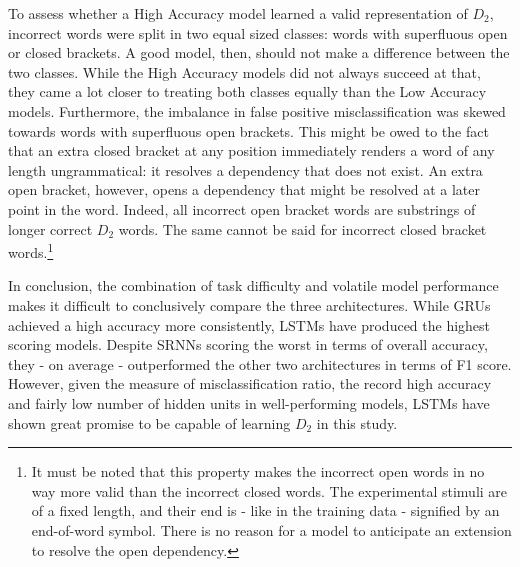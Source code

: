 To assess whether a High Accuracy model learned a valid representation of $D_{2}$, incorrect words were split in two equal sized classes: words with superfluous open or closed brackets. A good model, then, should not make a difference between the two classes. While the High Accuracy models did not always succeed at that, they came a lot closer to treating both classes equally than the Low Accuracy models. Furthermore, the imbalance in false positive misclassification was skewed towards words with superfluous open brackets. This might be owed to the fact that an extra closed bracket at any position immediately renders a word of any length ungrammatical: it resolves a dependency that does not exist. An extra open bracket, however, opens a dependency that might be resolved at a later point in the word. Indeed, all incorrect open bracket words are substrings of longer correct $D_{2}$ words. The same cannot be said for incorrect closed bracket words.\footnote{It must be noted that this property makes the incorrect open words in no way more valid than the incorrect closed words. The experimental stimuli are of a fixed length, and their end is - like in the training data - signified by an end-of-word symbol. There is no reason for a model to anticipate an extension to resolve the open dependency.}

In conclusion, the combination of task difficulty and volatile model performance makes it difficult to conclusively compare the three architectures. While GRUs achieved a high accuracy more consistently, LSTMs have produced the highest scoring models. Despite SRNNs scoring the worst in terms of overall accuracy, they - on average - outperformed the other two architectures in terms of F1 score. However, given the measure of misclassification ratio, the record high accuracy and fairly low number of hidden units in well-performing models, LSTMs have shown great promise to be capable of learning $D_{2}$ in this study.

